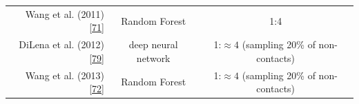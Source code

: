 \documentclass[11pt,a4paper,twoside]{book}
\theoremstyle{definition}
\theoremstyle{definition}
\theoremstyle{remark}
\begin{document}
\begin{longtable}[]{@{}rcc@{}}
\begin{minipage}[t]{0.32\columnwidth}
Wang et al. (2011) {[}\protect\hyperlink{ref-Wang2011}{71}{]}\strut
\end{minipage} & \begin{minipage}[t]{0.19\columnwidth}\centering\strut
Random Forest\strut
\end{minipage} & \begin{minipage}[t]{0.29\columnwidth}\centering\strut
1:4\strut
\end{minipage}\tabularnewline
\begin{minipage}[t]{0.32\columnwidth}\raggedleft\strut
DiLena et al. (2012) {[}\protect\hyperlink{ref-DiLena2012a}{79}{]}\strut
\end{minipage} & \begin{minipage}[t]{0.19\columnwidth}\centering\strut
deep neural network\strut
\end{minipage} & \begin{minipage}[t]{0.29\columnwidth}\centering\strut
1:\(\approx \!4\) (sampling 20\% of non-contacts)\strut
\end{minipage}\tabularnewline
\begin{minipage}[t]{0.32\columnwidth}\raggedleft\strut
Wang et al. (2013) {[}\protect\hyperlink{ref-Wang2013}{72}{]}\strut
\end{minipage} & \begin{minipage}[t]{0.19\columnwidth}\centering\strut
Random Forest\strut
\end{minipage} & \begin{minipage}[t]{0.29\columnwidth}\centering\strut
1:\(\approx 4\) (sampling 20\% of non-contacts)\strut
\end{minipage}\tabularnewline
\bottomrule
\end{longtable}
\end{document}
